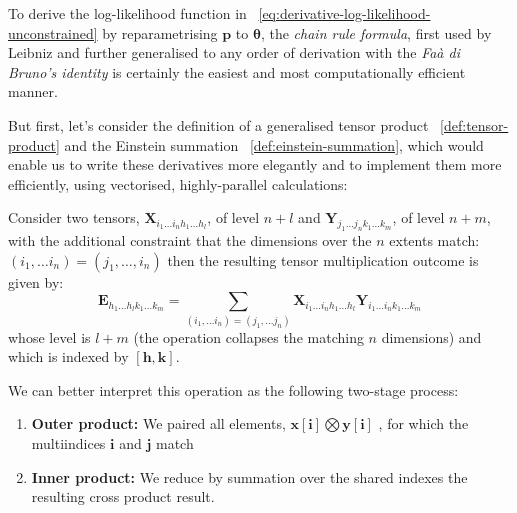 \documentclass[long, final]{jobim}
\begin{document}
To derive the log-likelihood function in \equationname~\ref{eq:derivative-log-likelihood-unconstrained} by reparametrising $\boldsymbol{p}$ to  $\boldsymbol{\theta}$, the \textit{chain rule formula}, first used by Leibniz and further generalised to any order of derivation with the \textit{Faà di Bruno's identity} is certainly the easiest and most computationally efficient manner. 

But first, let's consider the definition of a generalised tensor product ~\ref{def:tensor-product} and the Einstein summation ~\ref{def:einstein-summation}, which would enable us to write these derivatives more elegantly and to implement them more efficiently, using vectorised, highly-parallel calculations:
\begin{definition}
\label{def:tensor-product}
    Consider two tensors, $\boldsymbol{X}_{i_1 \ldots i_n h_1 \ldots h_l}$, of level $n + l$ and $\boldsymbol{Y}_{j_1 \ldots j_n k_1 \ldots k_m}$, of level $n + m$, with the additional constraint that the dimensions over the $n$ extents match:$(i_1, \ldots i_n)= (j_1, \ldots, i_n)$ then the resulting tensor multiplication outcome is given by:
$$
\boldsymbol{E}_{h_1\ldots h_l k_1 \ldots k_m} = \sum_{(i_1, \ldots i_n) =(j_1, \ldots j_n)} \boldsymbol{X}_{i_1 \ldots i_n h_1 \ldots h_l} \boldsymbol{Y}_{i_1 \ldots i_n k_1 \ldots k_m}
$$
whose level is $l + m$ (the operation collapses the matching $n$ dimensions) and which is indexed by $[\boldsymbol{h}, \boldsymbol{k}]$.

We can better interpret this operation as the following two-stage process:
\begin{enumerate}
\item \textbf{Outer product:} We paired all elements, $\boldsymbol{x}[\boldsymbol{i}] \bigotimes \boldsymbol{y}[\boldsymbol{i}]$ , for which the multiindices $\boldsymbol{i}$ and $\boldsymbol{j}$ match
\item  \textbf{Inner product:} We reduce by summation over the shared indexes the resulting cross product result. 
\end{enumerate}




\end{definition}
\end{document}

